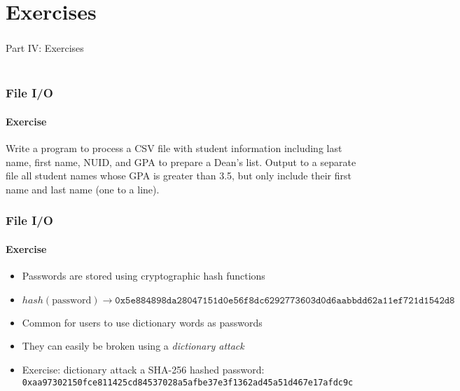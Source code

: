 \documentclass[]{beamer}
\begin{document}
\section{Exercises}

\begin{frame}
  \frametitle{}
  \framesubtitle{}
    
    \begin{center}
    {\Huge Part IV: Exercises}\\
    {\Large ~}
    \end{center}

\end{frame}

\begin{frame}[fragile]
  \frametitle{File I/O}
  \framesubtitle{Exercise}

Write a program to process a CSV file with student information including
last name, first name, NUID, and GPA to prepare a Dean's list.  Output to
a separate file all student names whose GPA is greater than 3.5, but only include
their first name and last name (one to a line).

\end{frame}

\begin{frame}[fragile]
  \frametitle{File I/O}
  \framesubtitle{Exercise}

\begin{itemize}[<+->]
  \item Passwords are stored using cryptographic hash functions
  \item   {\footnotesize
$hash(\textrm{password}) \rightarrow \texttt{0x5e884898da28047151d0e56f8dc6292773603d0d6aabbdd62a11ef721d1542d8}$}
  \item Common for users to use dictionary words as passwords
  \item They can easily be broken using a \emph{dictionary attack}
  \item Exercise: dictionary attack a SHA-256 hashed password:
  {\footnotesize
  \texttt{0xaa97302150fce811425cd84537028a5afbe37e3f1362ad45a51d467e17afdc9c}
  }
\end{itemize}
  
\end{frame}
\end{document}
